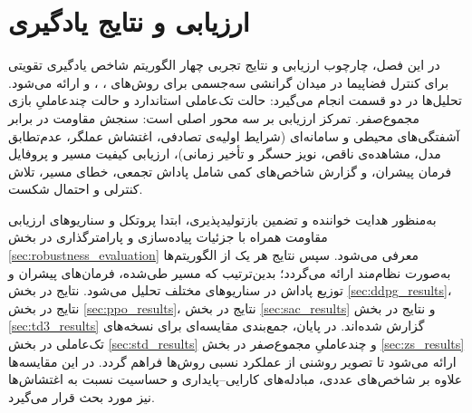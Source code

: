 \chapter{ارزیابی و نتایج یادگیری}\label{ch:results}

%




در این فصل، چارچوب ارزیابی و نتایج تجربی چهار الگوریتم شاخص یادگیری تقویتی برای کنترل فضاپیما در میدان گرانشی سه‌جسمی برای روش‌های  ، ،  و 
ارائه می‌شود. تحلیل‌ها در دو قسمت انجام می‌گیرد: حالت تک‌عاملی استاندارد و حالت چندعاملیِ بازی مجموع‌صفر. تمرکز ارزیابی بر سه محور اصلی است: سنجش مقاومت در برابر آشفتگی‌های محیطی و سامانه‌ای (شرایط اولیه‌ی تصادفی، اغتشاش عملگر، عدم‌تطابق مدل، مشاهده‌ی ناقص، نویز حسگر و تأخیر زمانی)، ارزیابی کیفیت مسیر و پروفایل فرمان پیشران، و گزارش شاخص‌های کمی شامل پاداش تجمعی، خطای مسیر، تلاش کنترلی و احتمال شکست.

به‌منظور هدایت خواننده و تضمین بازتولیدپذیری، ابتدا پروتکل و سناریوهای ارزیابی مقاومت همراه با جزئیات پیاده‌سازی و پارامترگذاری در بخش \ref{sec:robustness_evaluation} معرفی می‌شود. سپس نتایج هر یک از الگوریتم‌ها به‌صورت نظام‌مند ارائه می‌گردد؛ بدین‌ترتیب که مسیر طی‌شده، فرمان‌های پیشران و توزیع پاداش در سناریوهای مختلف تحلیل می‌شود. نتایج  در بخش \ref{sec:ddpg_results}، نتایج  در بخش \ref{sec:ppo_results}، نتایج  در بخش \ref{sec:sac_results} و نتایج  در بخش \ref{sec:td3_results} گزارش شده‌اند. در پایان، جمع‌بندی مقایسه‌ای برای نسخه‌های تک‌عاملی 
در بخش \ref{sec:std_results} 
و چندعاملیِ مجموع‌صفر
در بخش \ref{sec:zs_results}
 ارائه می‌شود تا تصویر روشنی از عملکرد نسبی روش‌ها فراهم گردد. در این مقایسه‌ها علاوه بر شاخص‌های عددی، مبادله‌های کارایی–پایداری و حساسیت نسبت به
 اغتشاش‌ها نیز مورد بحث قرار می‌گیرد.






